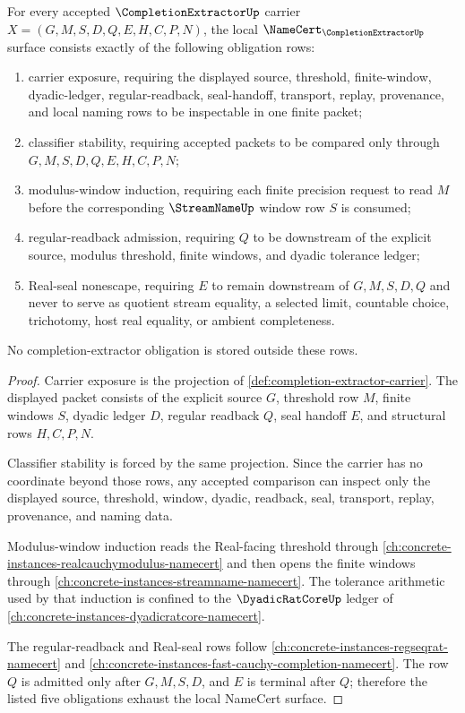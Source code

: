 \begin{theorem}\label{thm:completion-extractor-namecert-obligations}
For every accepted $\CompletionExtractorUp$ carrier $X=(G,M,S,D,Q,E,H,C,P,N)$, the local $\NameCert_{\CompletionExtractorUp}$ surface consists exactly of the following obligation rows:
\begin{enumerate}
\item carrier exposure, requiring the displayed source, threshold, finite-window, dyadic-ledger, regular-readback, seal-handoff, transport, replay, provenance, and local naming rows to be inspectable in one finite packet;
\item classifier stability, requiring accepted packets to be compared only through $G,M,S,D,Q,E,H,C,P,N$;
\item modulus-window induction, requiring each finite precision request to read $M$ before the corresponding $\StreamNameUp$ window row $S$ is consumed;
\item regular-readback admission, requiring $Q$ to be downstream of the explicit source, modulus threshold, finite windows, and dyadic tolerance ledger;
\item Real-seal nonescape, requiring $E$ to remain downstream of $G,M,S,D,Q$ and never to serve as quotient stream equality, a selected limit, countable choice, trichotomy, host real equality, or ambient completeness.
\end{enumerate}
No completion-extractor obligation is stored outside these rows.
\end{theorem}
\begin{proof}
Carrier exposure is the projection of \autoref{def:completion-extractor-carrier}. The displayed packet consists of the explicit source $G$, threshold row $M$, finite windows $S$, dyadic ledger $D$, regular readback $Q$, seal handoff $E$, and structural rows $H,C,P,N$.

Classifier stability is forced by the same projection. Since the carrier has no coordinate beyond those rows, any accepted comparison can inspect only the displayed source, threshold, window, dyadic, readback, seal, transport, replay, provenance, and naming data.

Modulus-window induction reads the Real-facing threshold through \autoref{ch:concrete-instances-realcauchymodulus-namecert} and then opens the finite windows through \autoref{ch:concrete-instances-streamname-namecert}. The tolerance arithmetic used by that induction is confined to the $\DyadicRatCoreUp$ ledger of \autoref{ch:concrete-instances-dyadicratcore-namecert}.

The regular-readback and Real-seal rows follow \autoref{ch:concrete-instances-regseqrat-namecert} and \autoref{ch:concrete-instances-fast-cauchy-completion-namecert}. The row $Q$ is admitted only after $G,M,S,D$, and $E$ is terminal after $Q$; therefore the listed five obligations exhaust the local NameCert surface.
\end{proof}

